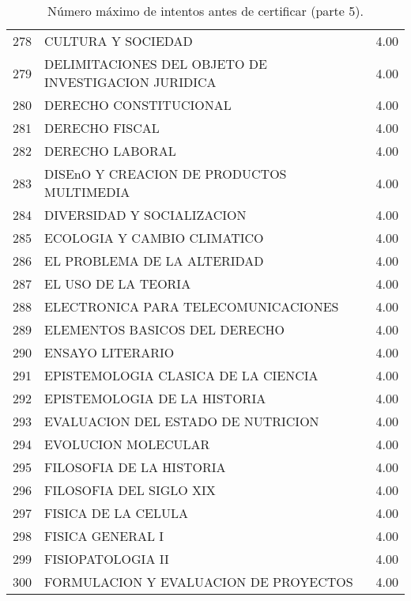\documentclass[12pt]{article}
\begin{document}
\begin{table}[ht]
{\begin{tabular}{rlr}
  278 & CULTURA Y SOCIEDAD & 4.00 \\ 
  279 & DELIMITACIONES DEL OBJETO DE INVESTIGACION JURIDICA & 4.00 \\ 
  280 & DERECHO CONSTITUCIONAL & 4.00 \\ 
  281 & DERECHO FISCAL & 4.00 \\ 
  282 & DERECHO LABORAL & 4.00 \\ 
  283 & DISEnO Y CREACION DE PRODUCTOS MULTIMEDIA & 4.00 \\ 
  284 & DIVERSIDAD Y SOCIALIZACION & 4.00 \\ 
  285 & ECOLOGIA Y CAMBIO CLIMATICO & 4.00 \\ 
  286 & EL PROBLEMA DE LA ALTERIDAD & 4.00 \\ 
  287 & EL USO DE LA TEORIA & 4.00 \\ 
  288 & ELECTRONICA PARA TELECOMUNICACIONES & 4.00 \\ 
  289 & ELEMENTOS BASICOS DEL DERECHO & 4.00 \\ 
  290 & ENSAYO LITERARIO & 4.00 \\ 
  291 & EPISTEMOLOGIA CLASICA DE LA CIENCIA & 4.00 \\ 
  292 & EPISTEMOLOGIA DE LA HISTORIA & 4.00 \\ 
  293 & EVALUACION DEL ESTADO DE NUTRICION & 4.00 \\ 
  294 & EVOLUCION MOLECULAR & 4.00 \\ 
  295 & FILOSOFIA DE LA HISTORIA & 4.00 \\ 
  296 & FILOSOFIA DEL SIGLO XIX & 4.00 \\ 
  297 & FISICA DE LA CELULA & 4.00 \\ 
  298 & FISICA GENERAL I & 4.00 \\ 
  299 & FISIOPATOLOGIA II & 4.00 \\ 
  300 & FORMULACION Y EVALUACION DE PROYECTOS & 4.00 \\ 
   \hline
\end{tabular}}
\caption{\label{Num_Max_Intentos_Cert_5} N\'umero m\'aximo de intentos antes de certificar (parte 5).}

\end{table}
\end{document}
